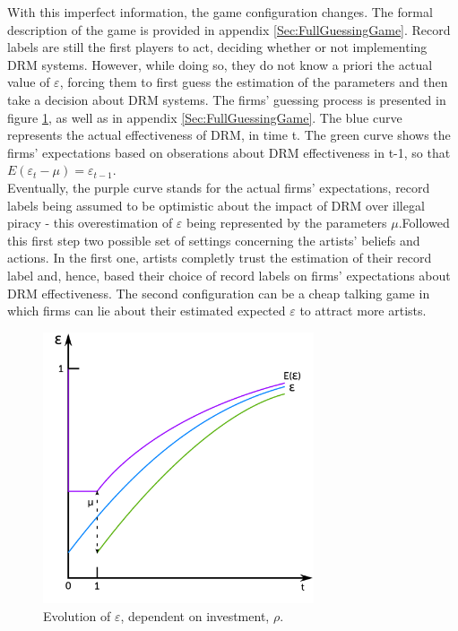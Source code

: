 \documentclass[a4paper,12pt]{article}
\numberwithin{equation}{section}
\begin{document}
With this imperfect information, the game configuration changes. The
formal description of the game is provided in appendix \ref{Sec:FullGuessingGame}. Record labels
are still the first players to act, deciding whether or not implementing
DRM systems. However, while doing so, they do not know a priori the
actual value of $\varepsilon$, forcing them to first guess the estimation
of the parameters and then take a decision about DRM systems. The
firms' guessing process is presented in figure \ref{Fig:EpsilonGuessing}, as well as in appendix \ref{Sec:FullGuessingGame}.
The blue curve represents the actual effectiveness of DRM, in time
t. The green curve shows the firms' expectations based on obserations
about DRM effectiveness in t-1, so that $E(\varepsilon_{t}-\mu)=\varepsilon_{t-1}$.\\

Eventually, the purple curve stands for the actual firms' expectations,
record labels being assumed to be optimistic about the impact of DRM
over illegal piracy - this overestimation of $\varepsilon$ being
represented by the parameters $\mu.$Followed this first step two
possible set of settings concerning the artists' beliefs and actions.
In the first one, artists completly trust the estimation of their
record label and, hence, based their choice of record labels on firms'
expectations about DRM effectiveness. The second configuration can
be a cheap talking game in which firms can lie about their estimated
expected $\varepsilon$ to attract more artists.\\

\begin{figure}[h!]
\centering
\includegraphics[width=8cm]{Graphics/graph2.pdf}
\caption{Evolution of $\varepsilon$, dependent on investment, $\rho$.}
\label{Fig:EpsilonGuessing}
\end{figure}
\end{document}
